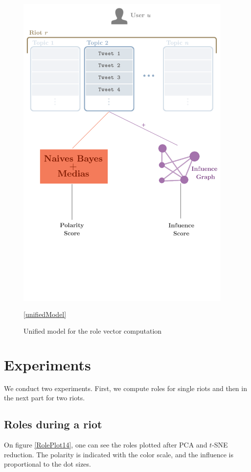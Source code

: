 \documentclass[a4paper,twoside,12pt,openright]{report}
\begin{document}
\begin{figure}[H]
\centering
\includegraphics[width=0.95\textwidth]{images/diags/chain.png}
\caption{Unified model for the role vector computation}
\ref{unifiedModel}
\end{figure}


\newpage

\section{Experiments}
We conduct two experiments. First, we compute roles for single riots and then in the next part for two riots. 
\subsection{Roles during a riot}
On figure \ref{RolePlot14}, one can see the roles plotted after PCA and $t$-SNE reduction. The polarity is indicated with the color scale, and the influence is proportional to the dot sizes. 
\end{document}
